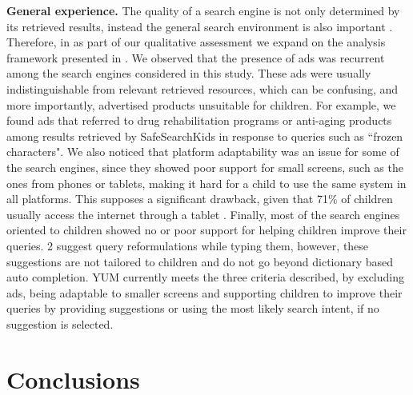 \documentclass{sig-alternate-05-2015}
\begin{document}
\noindent
\textbf{General experience.} The quality of a search engine is not only determined by its retrieved results, instead the general search environment is also important \cite{Gos13}. Therefore, in as part of our qualitative assessment we expand on the analysis framework presented in \cite{Gos13}. We observed that the presence of ads was recurrent among the search engines considered in this study. These ads were usually indistinguishable from relevant retrieved resources, which can be confusing, and more importantly, advertised products unsuitable for children. For example, we found ads that referred to drug rehabilitation programs or anti-aging products among results retrieved by SafeSearchKids in response to queries such as ``frozen characters". We also noticed that platform adaptability was an issue for some of the search engines, since they showed poor support for small screens, such as the ones from phones or tablets, making it hard for a child to use the same system in all platforms. This supposes a significant drawback, given that 71\% of children usually access the internet through a tablet \cite{ofcom}. Finally, most of the search engines oriented to children showed no or poor support for helping children improve their queries. 2 suggest query reformulations while typing them, however, these suggestions are not tailored to children and do not go beyond dictionary based auto completion. YUM currently meets the three criteria described, by excluding ads, being adaptable to smaller screens and supporting children to improve their queries by providing suggestions or using the most likely search intent, if no suggestion is selected.

\section{Conclusions}
\end{document}
